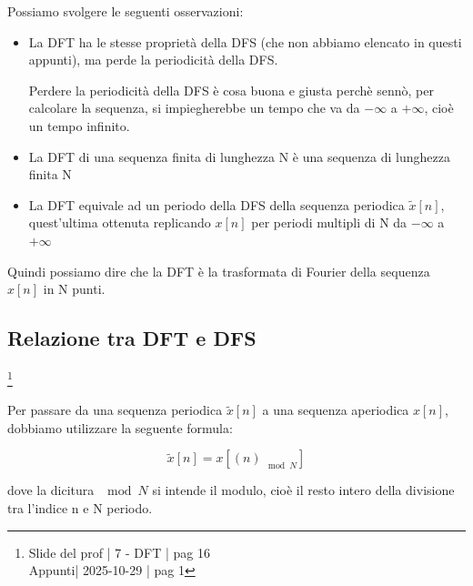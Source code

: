 Possiamo svolgere le seguenti osservazioni: 
\begin{itemize}

    \item La DFT ha le stesse proprietà della DFS (che non abbiamo elencato in questi appunti), ma perde la periodicità della DFS. \newline 

\begin{tcolorbox}
    Perdere la periodicità della DFS è cosa buona e giusta perchè sennò, per calcolare la sequenza, si impiegherebbe un tempo che va da $- \infty$ a $+ \infty$, 
    cioè un tempo infinito. 
\end{tcolorbox}

    \item La DFT di una sequenza finita di lunghezza N è una sequenza di lunghezza finita N 
    \item La DFT equivale ad un periodo della DFS della sequenza periodica $\tilde{x} \left[ n\right]$, quest'ultima ottenuta replicando $x \left[ n\right]$ per periodi multipli di N da $- \infty$ a $+ \infty$
\end{itemize}


\begin{tcolorbox}
    Quindi possiamo dire che la DFT è la trasformata di Fourier della sequenza $x \left[ n\right]$ in N punti. 
\end{tcolorbox}

\newpage 

\subsection{Relazione tra DFT e DFS}

\footnote{ 
    Slide del prof | 7 - DFT | pag 16\\
    Appunti| 2025-10-29 | pag 1
}

Per passare da una sequenza periodica $\tilde{x} \left[ n\right]$ a una sequenza aperiodica $x \left[ n\right]$, 
dobbiamo utilizzare la seguente formula: 

{
    \Large 
    \begin{equation}
        \tilde{x} \left[n\right]
        = 
        x \left[ \left(n \right)_{\mod N}\right]
    \end{equation}
}

dove la dicitura $\mod N$ si intende il modulo, cioè il resto intero della divisione tra l'indice n e N periodo. \newline 

